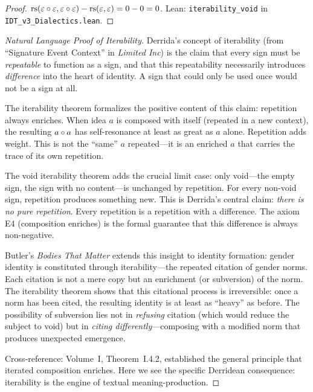 \begin{proof}
$\mathrm{rs}(\varepsilon \circ \varepsilon, \varepsilon \circ \varepsilon) - \mathrm{rs}(\varepsilon, \varepsilon) = 0 - 0 = 0$.
Lean: \texttt{iterability\_void} in \texttt{IDT\_v3\_Dialectics.lean}.
\end{proof}

\begin{proof}[Natural Language Proof of Iterability]
Derrida's concept of iterability (from ``Signature Event Context'' in
\textit{Limited Inc}) is the claim that every sign must be \emph{repeatable}
to function as a sign, and that this repeatability necessarily introduces
\emph{difference} into the heart of identity. A sign that could only be
used once would not be a sign at all.

The iterability theorem formalizes the positive content of this claim:
repetition always enriches. When idea $a$ is composed with itself (repeated
in a new context), the resulting $a \circ a$ has self-resonance at least
as great as $a$ alone. Repetition adds weight. This is not the ``same'' $a$
repeated---it is an enriched $a$ that carries the trace of its own repetition.

The void iterability theorem adds the crucial limit case: only void---the
empty sign, the sign with no content---is unchanged by repetition. For every
non-void sign, repetition produces something new. This is Derrida's central
claim: \emph{there is no pure repetition}. Every repetition is a repetition
with a difference. The axiom E4 (composition enriches) is the formal guarantee
that this difference is always non-negative.

Butler's \textit{Bodies That Matter} extends this insight to identity
formation: gender identity is constituted through iterability---the repeated
citation of gender norms. Each citation is not a mere copy but an enrichment
(or subversion) of the norm. The iterability theorem shows that this citational
process is irreversible: once a norm has been cited, the resulting identity
is at least as ``heavy'' as before. The possibility of subversion lies not in
\emph{refusing} citation (which would reduce the subject to void) but in
\emph{citing differently}---composing with a modified norm that produces
unexpected emergence.

Cross-reference: Volume~I, Theorem~I.4.2, established the general principle
that iterated composition enriches. Here we see the specific Derridean
consequence: iterability is the engine of textual meaning-production.
\end{proof}

